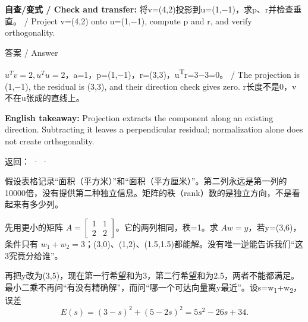 \textbf{自查/变式 / Check and transfer:} 将v=(4,2)投影到u=(1,\ensuremath{-}1)，求p、r并检查垂直。 / Project v=(4,2) onto u=(1,\ensuremath{-}1), compute p and r, and verify orthogonality.



\begin{StudySolution}{答案 / Answer}


\(u^Tv=2,u^Tu=2\)，a=1，p=(1,\ensuremath{-}1)，r=(3,3)，u\textsuperscript{T}r=3\ensuremath{-}3=0。 / The projection is (1,\ensuremath{-}1), the residual is (3,3), and their direction check gives zero. r长度不是0，v不在u张成的直线上。


\end{StudySolution}


\textbf{English takeaway:} Projection extracts the component along an existing direction. Subtracting it leaves a perpendicular residual; normalization alone does not create orthogonality.


返回： ·  · 








假设表格记录“面积（平方米）”和“面积（平方厘米）”。第二列永远是第一列的10000倍，没有提供第二种独立信息。矩阵的秩（rank）数的是独立方向，不是看起来有多少列。


先用更小的矩阵 \(A=\begin{bmatrix}1&1\\2&2\end{bmatrix}\)。它的两列相同，秩=1。求 \(Aw=y\)，若y=(3,6)，条件只有 \(w_1+w_2=3\)；(3,0)、(1,2)、(1.5,1.5)都能解。没有唯一逆能告诉我们“这3究竟分给谁”。






再把y改为(3,5)，现在第一行希望和为3，第二行希望和为2.5，两者不能都满足。最小二乘不再问“有没有精确解”，而问“哪一个可达向量离y最近”。设s=w\textsubscript{1}+w\textsubscript{2}，误差
\[
E(s)=(3-s)^2+(5-2s)^2=5s^2-26s+34.\tag{M.36}
\]


